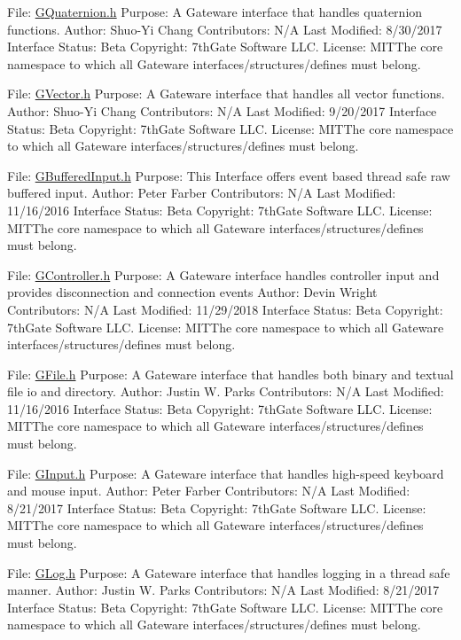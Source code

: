 File\+: \mbox{\hyperlink{_g_quaternion_8h_source}{G\+Quaternion.\+h}} Purpose\+: A Gateware interface that handles quaternion functions. Author\+: Shuo-\/\+Yi Chang Contributors\+: N/A Last Modified\+: 8/30/2017 Interface Status\+: Beta Copyright\+: 7th\+Gate Software L\+LC. License\+: M\+I\+T\+The core namespace to which all Gateware interfaces/structures/defines must belong.

File\+: \mbox{\hyperlink{_g_vector_8h_source}{G\+Vector.\+h}} Purpose\+: A Gateware interface that handles all vector functions. Author\+: Shuo-\/\+Yi Chang Contributors\+: N/A Last Modified\+: 9/20/2017 Interface Status\+: Beta Copyright\+: 7th\+Gate Software L\+LC. License\+: M\+I\+T\+The core namespace to which all Gateware interfaces/structures/defines must belong.

File\+: \mbox{\hyperlink{_g_buffered_input_8h_source}{G\+Buffered\+Input.\+h}} Purpose\+: This Interface offers event based thread safe raw buffered input. Author\+: Peter Farber Contributors\+: N/A Last Modified\+: 11/16/2016 Interface Status\+: Beta Copyright\+: 7th\+Gate Software L\+LC. License\+: M\+I\+T\+The core namespace to which all Gateware interfaces/structures/defines must belong.

File\+: \mbox{\hyperlink{_g_controller_8h_source}{G\+Controller.\+h}} Purpose\+: A Gateware interface handles controller input and provides disconnection and connection events Author\+: Devin Wright Contributors\+: N/A Last Modified\+: 11/29/2018 Interface Status\+: Beta Copyright\+: 7th\+Gate Software L\+LC. License\+: M\+I\+T\+The core namespace to which all Gateware interfaces/structures/defines must belong.

File\+: \mbox{\hyperlink{_g_file_8h_source}{G\+File.\+h}} Purpose\+: A Gateware interface that handles both binary and textual file io and directory. Author\+: Justin W. Parks Contributors\+: N/A Last Modified\+: 11/16/2016 Interface Status\+: Beta Copyright\+: 7th\+Gate Software L\+LC. License\+: M\+I\+T\+The core namespace to which all Gateware interfaces/structures/defines must belong.

File\+: \mbox{\hyperlink{_g_input_8h_source}{G\+Input.\+h}} Purpose\+: A Gateware interface that handles high-\/speed keyboard and mouse input. Author\+: Peter Farber Contributors\+: N/A Last Modified\+: 8/21/2017 Interface Status\+: Beta Copyright\+: 7th\+Gate Software L\+LC. License\+: M\+I\+T\+The core namespace to which all Gateware interfaces/structures/defines must belong.

File\+: \mbox{\hyperlink{_g_log_8h_source}{G\+Log.\+h}} Purpose\+: A Gateware interface that handles logging in a thread safe manner. Author\+: Justin W. Parks Contributors\+: N/A Last Modified\+: 8/21/2017 Interface Status\+: Beta Copyright\+: 7th\+Gate Software L\+LC. License\+: M\+I\+T\+The core namespace to which all Gateware interfaces/structures/defines must belong.

